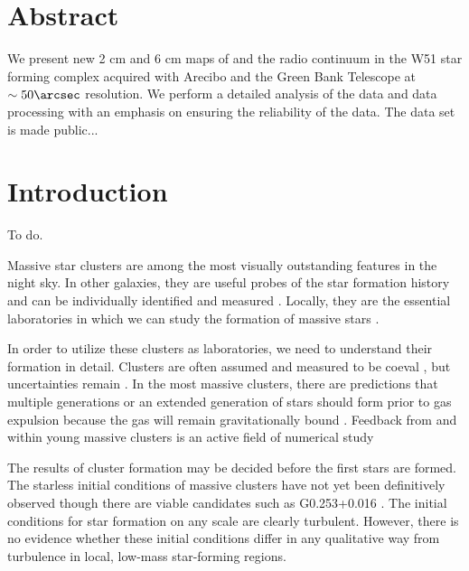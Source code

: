 


\section{Abstract}
We present new 2 cm and 6 cm maps of \formaldehyde and the radio continuum in
the W51 star forming complex acquired with Arecibo and the Green Bank Telescope
at $\sim50\arcsec$ resolution.
We perform a detailed analysis of the data and data processing with an emphasis on
ensuring the reliability of the data.
The data set is made public...


\section{Introduction}
To do.

Massive star clusters are among the most visually outstanding features in the
night sky.  In other galaxies, they are useful probes of the star formation history
and can be individually identified and measured \citep{Bastian2008a}.  Locally,
they are the essential laboratories in which we can study the formation of massive
stars \citep{Davies2012a}.

In order to utilize these clusters as laboratories, we need to understand their
formation in detail.  Clusters are often assumed and measured to be coeval
\citep[e.g.][]{Kudryavtseva2012a}, but uncertainties remain \citep{Beccari2010a}.
In the most massive clusters, there are predictions that multiple generations
or an extended generation of stars should form prior to gas expulsion because
the gas will remain gravitationally bound \citep{Bressert2012a}.   Feedback from
and within young massive clusters is an active field of numerical study
\citep{Rogers2013a,Dale2013a,Dale2012a,Dale2008a,Dale2005a,Parker2013a,Myers2014a,Krumholz2014a}

The results of cluster formation may be decided before the first stars are
formed.  The starless initial conditions of massive clusters have not yet been
definitively observed \citep{Ginsburg2012a} though there are viable candidates
such as G0.253+0.016 \citep{Longmore2012b}.  The initial conditions for star
formation on any scale are clearly turbulent.  However, there is no evidence
whether these initial conditions differ in any qualitative way from turbulence
in local, low-mass star-forming regions.



